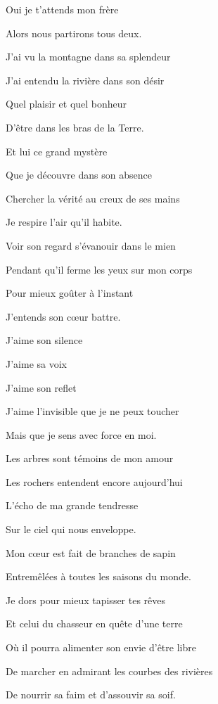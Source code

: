 {Oui je t’attends mon frère

Alors nous partirons tous deux.

\medskip

J’ai vu la montagne dans sa splendeur

J’ai entendu la rivière dans son désir

Quel plaisir et quel bonheur

D’être dans les bras de la Terre.

\medskip

Et lui ce grand mystère

Que je découvre dans son absence

Chercher la vérité au creux de ses mains

Je respire l’air qu’il habite.

\medskip

Voir son regard s’évanouir dans le mien

Pendant qu’il ferme les yeux sur mon corps

Pour mieux goûter à l’instant

J’entends son cœur battre.

\medskip

J’aime son silence

J’aime sa voix

J’aime son reflet

J’aime l’invisible que je ne peux toucher

Mais que je sens avec force en moi.

\medskip

Les arbres sont témoins de mon amour

Les rochers entendent encore aujourd’hui

L’écho de ma grande tendresse

Sur le ciel qui nous enveloppe.

\medskip

Mon cœur est fait de branches de sapin

Entremêlées à toutes les saisons du monde.

\medskip

Je dors pour mieux tapisser tes rêves

Et celui du chasseur en quête d’une terre

Où il pourra alimenter son envie d’être libre

De marcher en admirant les courbes des rivières

De nourrir sa faim et d’assouvir sa soif.

}
